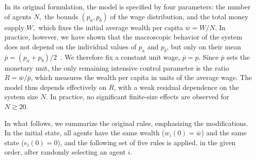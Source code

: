 In its original formulation, the model is specified by four parameters: the number of agents $N,$ the bounds $(p_a,p_b)$ of the wage distribution, and the total money supply $W,$ which fixes the initial average wealth per capita $\overline{w} = W/N$. In practice, however, we have shown that the macroscopic behavior of the system does not depend on the individual values of $p_a$ and $p_b$, but only on their mean $\overline{p}=(p_a+p_b)/2$~\cite{Borba2025}. We therefore fix a constant unit wage, $\overline{p}=p$.
Since $\overline{p}$ sets the monetary unit, the only remaining intensive control parameter is the ratio $R=\overline{w}/\overline{p}$, which measures the wealth per capita in units of the average wage. The model thus depends effectively on $R$, with a weak residual dependence on the system size $N$. In practice, no significant finite-size effects are observed for $N \gtrsim 20$.

In what follows, we summarize the original rules, emphasizing the modifications. In the initial state, all agents have the same wealth ($w_i(0)=\overline{w}$) and the same state ($e_i(0)=0$), and the following set of five rules is applied, in the given order, after randomly selecting an agent $i$.
  

